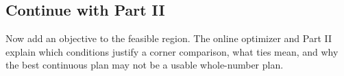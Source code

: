 \documentclass[11pt,letterpaper]{article}
\begin{document}
{\subsection*{Continue with Part II}
Now add an objective to the feasible region. The online optimizer and Part II explain which conditions justify a corner comparison, what ties mean, and why the best continuous plan may not be a usable whole-number plan.
}
\end{document}
